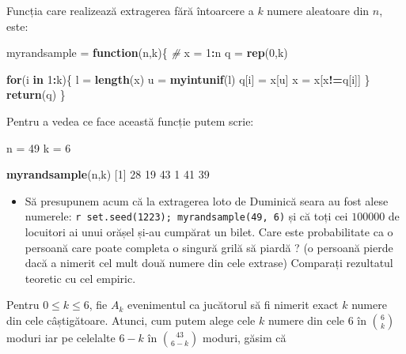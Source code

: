 \documentclass[]{article}
\newenvironment{Shaded}{\begin{snugshade}}{\end{snugshade}}
\newcommand{\KeywordTok}[1]{\textcolor[rgb]{0.13,0.29,0.53}{\textbf{#1}}}
\newcommand{\DecValTok}[1]{\textcolor[rgb]{0.00,0.00,0.81}{#1}}
\newcommand{\StringTok}[1]{\textcolor[rgb]{0.31,0.60,0.02}{#1}}
\newcommand{\CommentTok}[1]{\textcolor[rgb]{0.56,0.35,0.01}{\textit{#1}}}
\newcommand{\ControlFlowTok}[1]{\textcolor[rgb]{0.13,0.29,0.53}{\textbf{#1}}}
\newcommand{\OperatorTok}[1]{\textcolor[rgb]{0.81,0.36,0.00}{\textbf{#1}}}
\newcommand{\NormalTok}[1]{#1}
\newenvironment{frshaded*}{%
  \def\FrameCommand{\fboxrule=\FrameRule\fboxsep=\FrameSep \fcolorbox{framecolor}{shadecolor1}}%
  \MakeFramed {\advance\hsize-\width \FrameRestore}}%
{\endMakeFramed}
\newenvironment{rmdblock}[1]
  {\begin{frshaded*}
  \begin{itemize}
  \renewcommand{\labelitemi}{
    \raisebox{-.7\height}[0pt][0pt]{
      {\setkeys{Gin}{width=2em,keepaspectratio}\texttt{[image: images/icons/\#1]}}
    }
  }
  \item
  }
  {
  \end{itemize}
  \end{frshaded*}
  }
\newenvironment{rmdexercise}
  {\begin{rmdblock}{exercise}}
  {\end{rmdblock}}
\begin{document}
Funcția care realizează extragerea fără întoarcere a \(k\) numere
aleatoare din \(n\), este:

\begin{Shaded}
\begin{Highlighting}[]
\NormalTok{myrandsample =}\StringTok{ }\ControlFlowTok{function}\NormalTok{(n,k)\{}
  \CommentTok{# }
\NormalTok{  x =}\StringTok{ }\DecValTok{1}\OperatorTok{:}\NormalTok{n}
\NormalTok{  q =}\StringTok{ }\KeywordTok{rep}\NormalTok{(}\DecValTok{0}\NormalTok{,k)}
  
  \ControlFlowTok{for}\NormalTok{(i }\ControlFlowTok{in} \DecValTok{1}\OperatorTok{:}\NormalTok{k)\{}
\NormalTok{    l =}\StringTok{ }\KeywordTok{length}\NormalTok{(x)}
\NormalTok{    u =}\StringTok{ }\KeywordTok{myintunif}\NormalTok{(l)}
\NormalTok{    q[i] =}\StringTok{ }\NormalTok{x[u]}
\NormalTok{    x =}\StringTok{ }\NormalTok{x[x}\OperatorTok{!=}\NormalTok{q[i]]}
\NormalTok{  \}}
  \KeywordTok{return}\NormalTok{(q)}
\NormalTok{\}}
\end{Highlighting}
\end{Shaded}

Pentru a vedea ce face această funcție putem scrie:

\begin{Shaded}
\begin{Highlighting}[]
\NormalTok{n =}\StringTok{ }\DecValTok{49}
\NormalTok{k =}\StringTok{ }\DecValTok{6}

\KeywordTok{myrandsample}\NormalTok{(n,k)}
\NormalTok{[}\DecValTok{1}\NormalTok{] }\DecValTok{28} \DecValTok{19} \DecValTok{43}  \DecValTok{1} \DecValTok{41} \DecValTok{39}
\end{Highlighting}
\end{Shaded}

\begin{rmdexercise}
Să presupunem acum că la extragerea loto de Duminică seara au fost alese
numerele: \texttt{r\ set.seed(1223);\ myrandsample(49,\ 6)} și că toți
cei \(100000\) de locuitori ai unui orășel și-au cumpărat un bilet. Care
este probabilitate ca o persoană care poate completa o singură grilă să
piardă ? (o persoană pierde dacă a nimerit cel mult două numere din cele
extrase) Comparați rezultatul teoretic cu cel empiric.
\end{rmdexercise}

Pentru \(0\leq k \leq 6\), fie \(A_k\) evenimentul ca jucătorul să fi
nimerit exact \(k\) numere din cele câștigătoare. Atunci, cum putem
alege cele \(k\) numere din cele \(6\) în \(\binom{6}{k}\) moduri iar pe
celelalte \(6 - k\) în \(\binom{43}{6-k}\) moduri, găsim că
\end{document}
